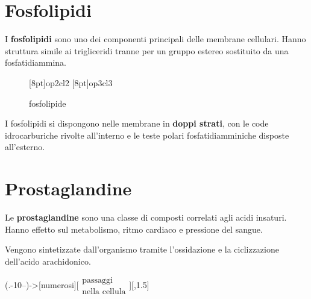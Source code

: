 \section{Fosfolipidi}\label{sec:fosfolipidi}
I \textbf{fosfolipidi} sono uno dei componenti principali delle membrane cellulari. Hanno struttura simile ai trigliceridi tranne per un gruppo estereo sostituito da una fosfatidiammina.
\begin{figure}[H]
	\centering
	\makepolymerdelims[delimiters=(),subscript=$\scriptstyle \!n$]{2pt}[8pt]{op2}{cl2}
	\makepolymerdelims[delimiters=(),subscript=$\scriptstyle \!n$]{2pt}[8pt]{op3}{cl3}
	\caption{fosfolipide}
\end{figure}

I fosfolipidi si dispongono nelle membrane in \textbf{doppi strati}, con le code idrocarburiche rivolte all'interno e le teste polari fosfatidiamminiche disposte all'esterno.


\section{Prostaglandine}\label{sec:prostaglandine}
Le \textbf{prostaglandine} sono una classe di composti correlati agli acidi insaturi. Hanno effetto sul metabolismo, ritmo cardiaco e pressione del sangue.

Vengono sintetizzate dall'organismo tramite l'ossidazione e la ciclizzazione dell'acido arachidonico.
	{\footnotesize
		\begin{reaction}
			\arrow(.-10--){->[\scriptsize numerosi][$\substack{\text{passaggi}\\ \text{nella cellula}}$]}[,1.5]
		\end{reaction}
	}


